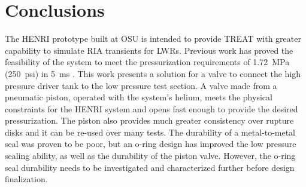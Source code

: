 \section{Conclusions} \label{s:conclusion}
The HENRI prototype built at OSU is intended to provide TREAT with greater capability to simulate RIA transients for LWRs.
Previous work has proved the feasibility of the system to meet the pressurization requirements of \SI{1.72}{\mega\pascal} (\SI{250}{psi}) in \SI{5}{\milli\second} \cite{HeNURETH}.
This work presents a solution for a valve to connect the high pressure driver tank to the low pressure test section.
A valve made from a pneumatic piston, operated with the system's helium, meets the physical constraints for the HENRI system and opens fast enough to provide the desired pressurization.
The piston also provides much greater consistency over rupture disks and it can be re-used over many tests.
The durability of a metal-to-metal seal was proven to be poor, but an o-ring design has improved the low pressure sealing ability, as well as the durability of the piston valve.
However, the o-ring seal durability needs to be investigated and characterized further before design finalization.